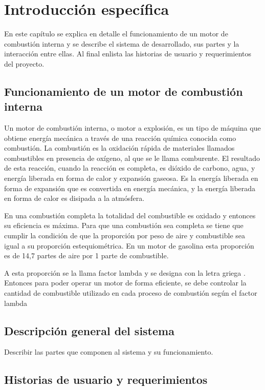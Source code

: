 \chapter{Introducción específica} %

\label{Chapter2}

En este capítulo se explica en detalle el funcionamiento de un motor de combustión interna y se describe el sistema de desarrollado, sus partes y la interacción entre ellas. Al final enlista las historias de usuario y requerimientos del proyecto.

\section{Funcionamiento de un motor de combustión interna}

Un motor de combustión interna, o motor a explosión, es un tipo de máquina que obtiene energía mecánica a través de una reacción química conocida como combustión. La combustión es la oxidación rápida de materiales llamados combustibles en presencia de oxígeno, al que se le llama comburente. El resultado de esta reacción, cuando la reacción es completa, es dióxido de carbono, agua, y energía liberada en forma de calor y expansión gaseosa. Es la energía liberada en forma de expansión que es convertida en energía mecánica, y la energía liberada en forma de calor es disipada a la atmósfera.

En una combustión completa la totalidad del combustible es oxidado y entonces su eficiencia es máxima. Para que una combustión sea completa se tiene que cumplir la condición de que la proporción por peso de aire y combustible sea igual a su proporción estequiométrica. En un motor de gasolina esta proporción es de 14,7 partes de aire por 1 parte de combustible.

A esta proporción se la llama factor lambda y se designa con la letra griega \lambda. Entonces para poder operar un motor de forma eficiente, se debe controlar la cantidad de combustible utilizado en cada proceso de combustión según el factor lambda

\section{Descripción general del sistema}

Describir las partes que componen al sistema y su funcionamiento.

\section{Historias de usuario y requerimientos}

